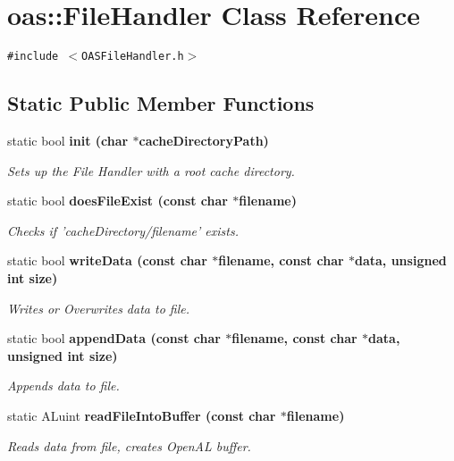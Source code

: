 \section{oas::File\-Handler Class Reference}
\label{classoas_1_1FileHandler}
{\tt \#include $<$OASFile\-Handler.h$>$}

\subsection*{Static Public Member Functions}
\begin{CompactItemize}
\item 
static bool \bf{init} (char $\ast$cache\-Directory\-Path)
\begin{CompactList}\small\item\em Sets up the File Handler with a root cache directory. \item\end{CompactList}\item 
static bool \bf{does\-File\-Exist} (const char $\ast$filename)
\begin{CompactList}\small\item\em Checks if 'cache\-Directory/filename' exists. \item\end{CompactList}\item 
static bool \bf{write\-Data} (const char $\ast$filename, const char $\ast$data, unsigned int size)
\begin{CompactList}\small\item\em Writes or Overwrites data to file. \item\end{CompactList}\item 
static bool \bf{append\-Data} (const char $\ast$filename, const char $\ast$data, unsigned int size)
\begin{CompactList}\small\item\em Appends data to file. \item\end{CompactList}\item 
static ALuint \bf{read\-File\-Into\-Buffer} (const char $\ast$filename)
\begin{CompactList}\small\item\em Reads data from file, creates Open\-AL buffer. \item\end{CompactList}\end{CompactItemize}
